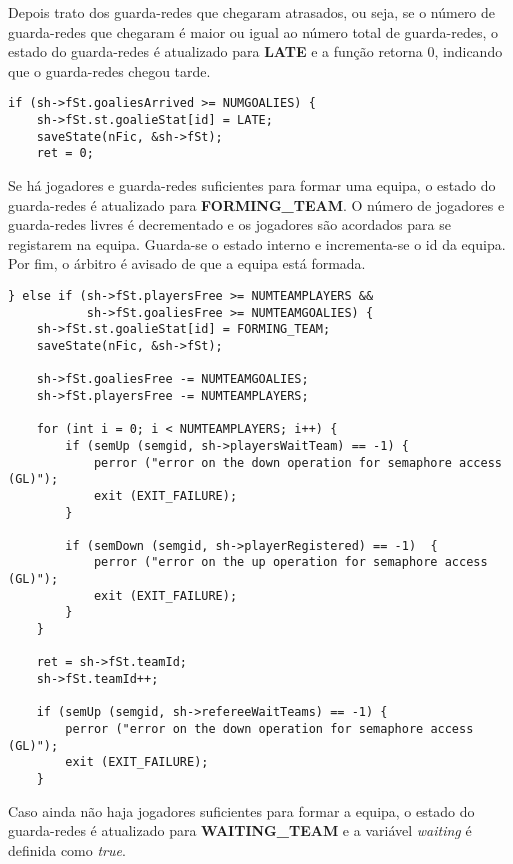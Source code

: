 \documentclass[code,math]{relatorio-deti}
\begin{document}
Depois trato dos guarda-redes que chegaram atrasados, ou seja, se o número de guarda-redes que chegaram é maior ou igual ao número total de guarda-redes, o estado do guarda-redes é atualizado para \textbf{LATE} e a função retorna 0, indicando que o guarda-redes chegou tarde.

\begin{verbatim}
if (sh->fSt.goaliesArrived >= NUMGOALIES) {
    sh->fSt.st.goalieStat[id] = LATE;
    saveState(nFic, &sh->fSt);
    ret = 0;
\end{verbatim}

Se há jogadores e guarda-redes suficientes para formar uma equipa, o estado do guarda-redes é atualizado para \textbf{FORMING\_TEAM}. O número de jogadores e guarda-redes livres é decrementado e os jogadores são acordados para se registarem na equipa. Guarda-se o estado interno e incrementa-se o id da equipa. Por fim, o árbitro é avisado de que a equipa está formada.

\begin{verbatim}
} else if (sh->fSt.playersFree >= NUMTEAMPLAYERS && 
           sh->fSt.goaliesFree >= NUMTEAMGOALIES) {
    sh->fSt.st.goalieStat[id] = FORMING_TEAM;
    saveState(nFic, &sh->fSt);

    sh->fSt.goaliesFree -= NUMTEAMGOALIES;
    sh->fSt.playersFree -= NUMTEAMPLAYERS;

    for (int i = 0; i < NUMTEAMPLAYERS; i++) {
        if (semUp (semgid, sh->playersWaitTeam) == -1) {                                                         
            perror ("error on the down operation for semaphore access (GL)");
            exit (EXIT_FAILURE);
        }    

        if (semDown (semgid, sh->playerRegistered) == -1)  {                                                     
            perror ("error on the up operation for semaphore access (GL)");
            exit (EXIT_FAILURE);
        }
    }

    ret = sh->fSt.teamId;
    sh->fSt.teamId++;

    if (semUp (semgid, sh->refereeWaitTeams) == -1) {                                                         
        perror ("error on the down operation for semaphore access (GL)");
        exit (EXIT_FAILURE);
    }      
\end{verbatim}

Caso ainda não haja jogadores suficientes para formar a equipa, o estado do guarda-redes é atualizado para \textbf{WAITING\_TEAM} e a variável \textit{waiting} é definida como \textit{true}.
\end{document}
